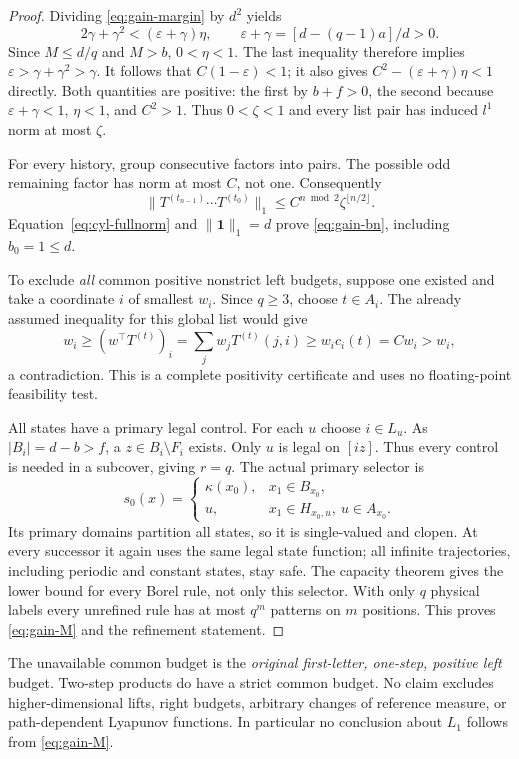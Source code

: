 \documentclass[11pt,reqno]{amsart}
\numberwithin{equation}{section}
\theoremstyle{definition}
\newcommand{\one}{\mathbf 1}
\newcommand{\eps}{\varepsilon}
\begin{document}
\begin{proof}
Dividing \eqref{eq:gain-margin} by $d^2$ yields
\[
 2\gamma+\gamma^2<(\eps+\gamma)\eta,
 \qquad\eps+\gamma=[d-(q-1)a]/d>0.
\]
Since $M\le d/q$ and $M>b$, $0<\eta<1$. The last inequality
therefore implies $\eps>\gamma+\gamma^2>\gamma$.
It follows that $C(1-\eps)<1$; it also gives
$C^2-(\eps+\gamma)\eta<1$ directly. Both quantities are positive:
the first by $b+f>0$, the second because
$\eps+\gamma<1$, $\eta<1$, and $C^2>1$.
Thus $0<\zeta<1$ and every list pair has induced $l^1$ norm
at most $\zeta$.

For every history, group consecutive factors into pairs. The possible
odd remaining factor has norm at most $C$, not one. Consequently
\[
 \|T^{(t_{n-1})}\cdots T^{(t_0)}\|_1
 \le C^{n\bmod2}\zeta^{\lfloor n/2\rfloor}.
\]
Equation~\eqref{eq:cyl-fullnorm} and $\|\one\|_1=d$ prove
\eqref{eq:gain-bn}, including $b_0=1\le d$.

To exclude \emph{all} common positive nonstrict left budgets,
suppose one existed and take a coordinate $i$ of smallest $w_i$.
Since $q\ge3$, choose $t\in A_i$. The already assumed
inequality for this global list would give
\[
 w_i\ge(w^\top T^{(t)})_i
 =\sum_jw_jT^{(t)}(j,i)\ge w_i c_i(t)=Cw_i>w_i,
\]
a contradiction. This is a complete positivity certificate and
uses no floating-point feasibility test.

All states have a primary legal control. For each $u$ choose
$i\in L_u$. As $|B_i|=d-b>f$, a $z\in B_i\setminus F_i$
exists. Only $u$ is legal on $[iz]$. Thus every control is needed
in a subcover, giving $r=q$.
The actual primary selector is
\begin{equation}\label{eq:gain-selector}
 s_0(x)=\begin{cases}
 \kappa(x_0),&x_1\in B_{x_0},\\
 u,&x_1\in H_{x_0,u},\ u\in A_{x_0}.
 \end{cases}
\end{equation}
Its primary domains partition all states, so it is single-valued
and clopen. At every successor it again uses the same legal state
function; all infinite trajectories, including periodic and constant
states, stay safe. The capacity theorem gives the lower bound for
every Borel rule, not only this selector. With only $q$ physical
labels every unrefined rule has at most $q^m$ patterns on $m$
positions. This proves \eqref{eq:gain-M} and the refinement statement.
\end{proof}

The unavailable common budget is the \emph{original first-letter,
one-step, positive left} budget. Two-step products do have a strict
common budget. No claim excludes higher-dimensional lifts, right
budgets, arbitrary changes of reference measure, or path-dependent
Lyapunov functions. In particular no conclusion about $L_1$ follows
from \eqref{eq:gain-M}.
\end{document}
